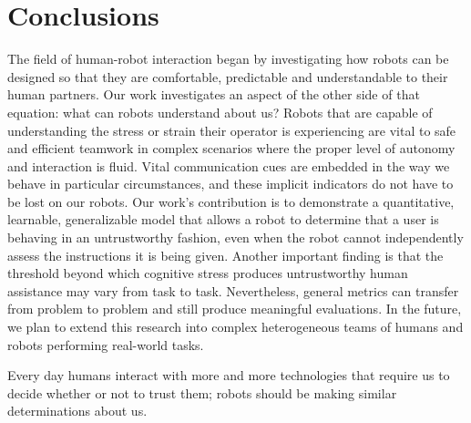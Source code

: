 \documentclass{sig-alternate}
\begin{document}
\section{Conclusions}

The field of human-robot interaction began by investigating how robots
can be designed so that they are comfortable, predictable and
understandable to their human partners.  Our work investigates an
aspect of the other side of that equation: what can robots understand
about us?  Robots that are capable of understanding the stress or
strain their operator is experiencing are vital to safe and efficient
teamwork in complex scenarios where the proper level of autonomy and
interaction is fluid.  Vital communication cues are embedded in the
way we behave in particular circumstances, and these implicit
indicators do not have to be lost on our robots.  Our work's
contribution is to demonstrate a quantitative, learnable,
generalizable model that allows a robot to determine that a user is
behaving in an untrustworthy fashion, even when the robot cannot
independently assess the instructions it is being given.  Another
important finding is that the threshold beyond which cognitive stress
produces untrustworthy human assistance may vary from task to task.
Nevertheless, general metrics can transfer from problem to problem and
still produce meaningful evaluations.  In the future, we plan to
extend this research into complex heterogeneous teams of humans and
robots performing real-world tasks.

Every day humans interact with more and more technologies that require
us to decide whether or not to trust them; robots should be making
similar determinations about us.

\end{document}
